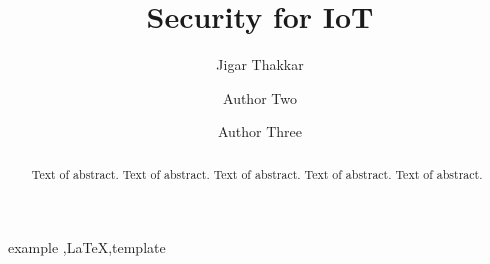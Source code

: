 \documentclass[preprint,10pt,5p]{elsarticle}
\begin{document}
\begin{frontmatter}

\title{Security for IoT}


 
\author[label1]{Jigar Thakkar}
\address[label1]{Master of IT,The University of Melbourne, Vic - 3010, Australia, thakkarj@student.unimelb.edu.au}
\address[label2]{Address Two}



\author[label5]{Author Two}
\address[label5]{Some University}

\author[label1,label5]{Author Three}

\begin{abstract}
Text of abstract. Text of abstract. Text of abstract. Text of abstract. Text of abstract. 
\end{abstract}

\begin{keyword}
example \sep \LaTeX \sep template
\end{keyword}

\end{frontmatter}


\end{document}

